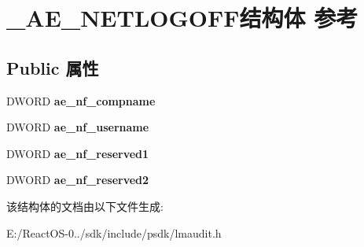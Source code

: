 \hypertarget{struct___a_e___n_e_t_l_o_g_o_f_f}{}\section{\+\_\+\+A\+E\+\_\+\+N\+E\+T\+L\+O\+G\+O\+F\+F结构体 参考}
\label{struct___a_e___n_e_t_l_o_g_o_f_f}
\subsection*{Public 属性}
\begin{DoxyCompactItemize}
\item 
\mbox{\label{struct___a_e___n_e_t_l_o_g_o_f_f_a46105bbbec25945c0c7fb9ded5b8e410}} 
D\+W\+O\+RD {\bfseries ae\+\_\+nf\+\_\+compname}
\item 
\mbox{\label{struct___a_e___n_e_t_l_o_g_o_f_f_ae52362a9e20ecfdb7f9ddf43661f741e}} 
D\+W\+O\+RD {\bfseries ae\+\_\+nf\+\_\+username}
\item 
\mbox{\label{struct___a_e___n_e_t_l_o_g_o_f_f_a61dc0718c7defc20d57a53af4336b02a}} 
D\+W\+O\+RD {\bfseries ae\+\_\+nf\+\_\+reserved1}
\item 
\mbox{\label{struct___a_e___n_e_t_l_o_g_o_f_f_ac2978246ded4ba612a97fd7cbfb747e4}} 
D\+W\+O\+RD {\bfseries ae\+\_\+nf\+\_\+reserved2}
\end{DoxyCompactItemize}


该结构体的文档由以下文件生成\+:\begin{DoxyCompactItemize}
\item 
E\+:/\+React\+O\+S-\/0../sdk/include/psdk/lmaudit.\+h\end{DoxyCompactItemize}
